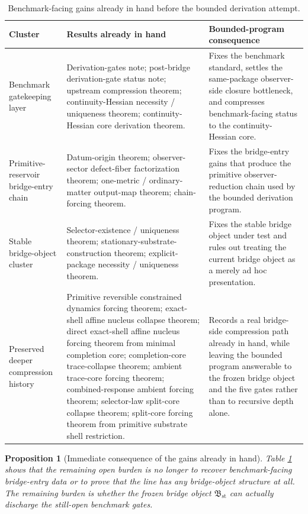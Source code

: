 \documentclass[11pt]{article}
\newcommand{\StableBridgeObject}{\mathfrak B_{\mathrm{st}}}
\newtheorem{proposition}{Proposition}
\begin{document}
\begin{table}[ht]
\centering
\renewcommand{\arraystretch}{1.2}
\begin{tabular}{>{\raggedright\arraybackslash}p{} >{\raggedright\arraybackslash}p{} >{\raggedright\arraybackslash}p{}}
\toprule
\textbf{Cluster} & \textbf{Results already in hand} & \textbf{Bounded-program consequence} \\
\midrule
Benchmark gatekeeping layer & Derivation-gates note; post-bridge derivation-gate status note; upstream compression theorem; continuity-Hessian necessity / uniqueness theorem; continuity-Hessian core derivation theorem. & Fixes the benchmark standard, settles the same-package observer-side closure bottleneck, and compresses benchmark-facing status to the continuity-Hessian core. \\
Primitive-reservoir bridge-entry chain & Datum-origin theorem; observer-sector defect-fiber factorization theorem; one-metric / ordinary-matter output-map theorem; chain-forcing theorem. & Fixes the bridge-entry gains that produce the primitive observer-reduction chain used by the bounded derivation program. \\
Stable bridge-object cluster & Selector-existence / uniqueness theorem; stationary-substrate-construction theorem; explicit-package necessity / uniqueness theorem. & Fixes the stable bridge object under test and rules out treating the current bridge object as a merely ad hoc presentation. \\
Preserved deeper compression history & Primitive reversible constrained dynamics forcing theorem; exact-shell affine nucleus collapse theorem; direct exact-shell affine nucleus forcing theorem from minimal completion core; completion-core trace-collapse theorem; ambient trace-core forcing theorem; combined-response ambient forcing theorem; selector-law split-core collapse theorem; split-core forcing theorem from primitive substrate shell restriction. & Records a real bridge-side compression path already in hand, while leaving the bounded program answerable to the frozen bridge object and the five gates rather than to recursive depth alone. \\
\bottomrule
\end{tabular}
\caption{Benchmark-facing gains already in hand before the bounded derivation attempt.}
\label{tab:gains}
\end{table}

\begin{proposition}[Immediate consequence of the gains already in hand]
Table \ref{tab:gains} shows that the remaining open burden is no longer to recover benchmark-facing bridge-entry data or to prove that the line has any bridge-object structure at all. The remaining burden is whether the frozen bridge object \(\StableBridgeObject\) can actually discharge the still-open benchmark gates.
\end{proposition}
\end{document}

